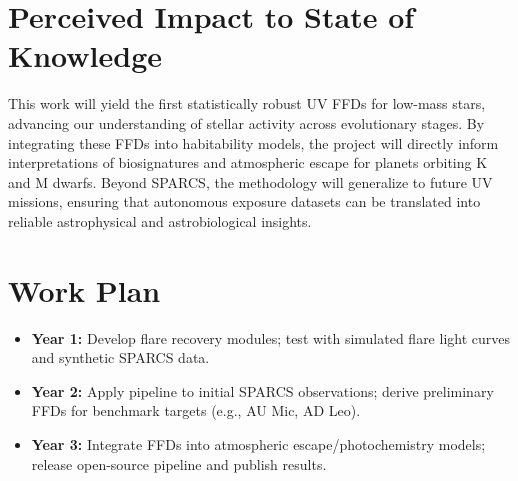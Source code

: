 \documentclass[final,letterpaper,oneside,12pt]{article}
\begin{document}
\section{Perceived Impact to State of Knowledge}
This work will yield the first statistically robust UV FFDs for low-mass stars, advancing our understanding of stellar activity across evolutionary stages. By integrating these FFDs into habitability models, the project will directly inform interpretations of biosignatures and atmospheric escape for planets orbiting K and M dwarfs. Beyond SPARCS, the methodology will generalize to future UV missions, ensuring that autonomous exposure datasets can be translated into reliable astrophysical and astrobiological insights.

\section{Work Plan}
\begin{itemize}
    \item \textbf{Year 1:} Develop flare recovery modules; test with simulated flare light curves and synthetic SPARCS data.
    \item \textbf{Year 2:} Apply pipeline to initial SPARCS observations; derive preliminary FFDs for benchmark targets (e.g., AU Mic, AD Leo).
    \item \textbf{Year 3:} Integrate FFDs into atmospheric escape/photochemistry models; release open-source pipeline and publish results.
\end{itemize}

\newpage
\singlespacing
\setlength{\bibsep}{0ex}


\end{document}
